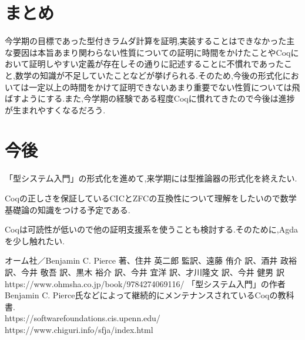 \documentclass[a4j,10pt,fleqn]{jsarticle}
\begin{document}
\section{まとめ}
今学期の目標であった型付きラムダ計算を証明,実装することはできなかった主な要因は本旨あまり関わらない性質についての証明に時間をかけたことやCoqにおいて証明しやすい定義が存在しその通りに記述することに不慣れであったこと,数学の知識が不足していたことなどが挙げられる.そのため,今後の形式化においては一定以上の時間をかけて証明できないあまり重要でない性質については飛ばすようにする.また,今学期の経験である程度Coqに慣れてきたので今後は進捗が生まれやすくなるだろう.

\section{今後}
「型システム入門」の形式化を進めて,来学期には型推論器の形式化を終えたい.\par
Coqの正しさを保証しているCICとZFCの互換性について理解をしたいので数学基礎論の知識をつける予定である.\par
Coqは可読性が低いので他の証明支援系を使うことも検討する.そのために,Agdaを少し触れたい.\par


\begin{thebibliography}{}
 オーム社／Benjamin C. Pierce 著、住井 英二郎 監訳、遠藤 侑介 訳、酒井 政裕 訳、今井 敬吾 訳、黒木 裕介 訳、今井 宜洋 訳、才川隆文 訳、今井 健男 訳 https://www.ohmsha.co.jp/book/9784274069116/
 「型システム入門」の作者Benjamin C. Pierce氏などによって継続的にメンテナンスされているCoqの教科書.\\
https://softwarefoundations.cis.upenn.edu/
 https://www.chiguri.info/sfja/index.html
\end{thebibliography}
\end{document}
